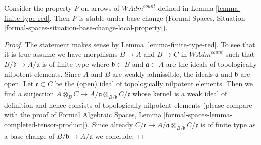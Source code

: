\begin{lemma}
\label{lemma-base-change-finite-type-red}
Consider the property $P$ on arrows of $\textit{WAdm}^{count}$ defined in
Lemma \ref{lemma-finite-type-red}. Then $P$ is stable under base change
(Formal Spaces, Situation
\ref{formal-spaces-situation-base-change-local-property}).
\end{lemma}

\begin{proof}
The statement makes sense by Lemma \ref{lemma-finite-type-red}.
To see that it is true assume we have morphisms $B \to A$ and $B \to C$
in $\textit{WAdm}^{count}$ such that $B/\mathfrak b \to A/\mathfrak a$
is of finite type where $\mathfrak b \subset B$ and $\mathfrak a \subset A$
are the ideals of topologically nilpotent elements.
Since $A$ and $B$ are weakly admissible, the ideals
$\mathfrak a$ and $\mathfrak b$ are open.
Let $\mathfrak c \subset C$ be the (open) ideal
of topologically nilpotent elements. Then we find a surjection
$A \widehat{\otimes}_B C \to
A/\mathfrak a \otimes_{B/\mathfrak b} C/\mathfrak c$
whose kernel is a weak ideal of definition and hence consists
of topologically nilpotent elements
(please compare with the proof of Formal Algebraic Spaces,
Lemma \ref{formal-spaces-lemma-completed-tensor-product}). Since already
$C/\mathfrak c \to A/\mathfrak a \otimes_{B/\mathfrak b} C/\mathfrak c$
is of finite type as a base change of $B/\mathfrak b \to A/\mathfrak a$
we conclude.
\end{proof}

